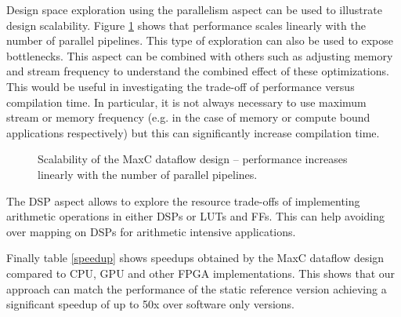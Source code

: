 Design space exploration using the parallelism aspect can be used to
illustrate design scalability. Figure \ref{fig:scalability} shows that
performance scales linearly with the number of parallel
pipelines. This type of exploration can also be used to expose
bottlenecks. This aspect can be combined with others such as adjusting
memory and stream frequency to understand the combined effect of these
optimizations. This would be useful in investigating the trade-off of
performance versus compilation time. In particular, it is not always
necessary to use maximum stream or memory frequency (e.g. in the case
of memory or compute bound applications respectively) but this can
significantly increase compilation time.

\begin{figure}[!h]
  \centering
  \caption{Scalability of the MaxC dataflow design -- performance
    increases linearly with the number of parallel pipelines.}
  \label{fig:scalability}
\end{figure}


The DSP aspect allows to explore the resource trade-offs of
implementing arithmetic operations in either DSPs or LUTs and
FFs. This can help avoiding over mapping on DSPs for arithmetic
intensive applications.


Finally table \ref{speedup} shows speedups obtained by the MaxC
dataflow design compared to CPU, GPU and other FPGA
implementations. This shows that our approach can match the
performance of the static reference version achieving a significant
speedup of up to 50x over software only versions.

